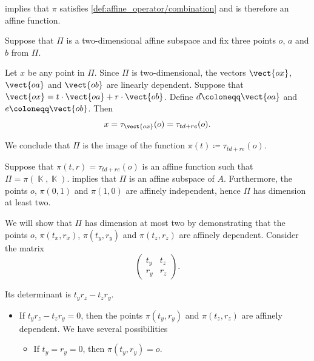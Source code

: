 \begin{defproof}
    implies that \( \pi \) satisfies \cref{def:affine_operator/combination} and is therefore an affine function.

   Suppose that \( \Pi \) is a two-dimensional affine subspace and fix three points \( o \), \( a \) and \( b \) from \( \Pi \).

  Let \( x \) be any point in \( \Pi \). Since \( \Pi \) is two-dimensional, the vectors \( \vect{ox} \), \( \vect{oa} \) and \( \vect{ob} \) are linearly dependent. Suppose that \( \vect{ox} = t \cdot \vect{oa} + r \cdot \vect{ob} \). Define \( d \coloneqq \vect{oa} \) and \( e \coloneqq \vect{ob} \). Then
  \begin{equation*}
    x = \tau_{\vect{ox}}(o) = \tau_{td + re}(o).
  \end{equation*}

  We conclude that \( \Pi \) is the image of the function \( \pi(t) \coloneqq \tau_{td + re}(o) \).

   Suppose that \( \pi(t, r) = \tau_{td + re}(o) \) is an affine function such that \( \Pi = \pi(\BbbK, \BbbK) \).  implies that \( \Pi \) is an affine subspace of \( A \). Furthermore, the points \( o \), \( \pi(0, 1) \) and \( \pi(1, 0) \) are affinely independent, hence \( \Pi \) has dimension at least two.

  We will show that \( \Pi \) has dimension at most two by demonstrating that the points \( o \), \( \pi(t_x, r_x) \), \( \pi(t_y, r_y) \) and \( \pi(t_z, r_z) \) are affinely dependent. Consider the matrix
  \begin{equation*}
    \begin{pmatrix}
      t_y & t_z \\
      r_y & r_z
    \end{pmatrix}.
  \end{equation*}

  Its determinant is \( t_y r_z - t_z r_y \).

  \begin{itemize}
    \item If \( t_y r_z - t_z r_y = 0 \), then the points \( \pi(t_y, r_y) \) and \( \pi(t_z, r_z) \) are affinely dependent. We have several possibilities
    \begin{itemize}
      \item If \( t_y = r_y = 0 \), then \( \pi(t_y, r_y) = o \).


\end{itemize}
\end{itemize}
\end{defproof}
